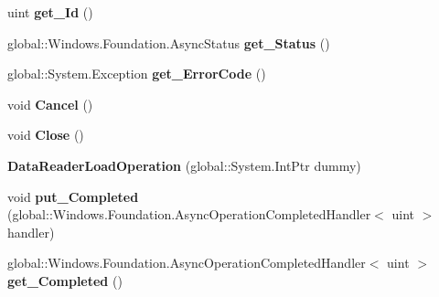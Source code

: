 \begin{DoxyCompactItemize}
uint {\bfseries get\+\_\+\+Id} ()
\item 
\mbox{\label{class_windows_1_1_storage_1_1_streams_1_1_data_reader_load_operation_a7eee8fde2644e8d129c57b70e838cd7d}} 
global\+::\+Windows.\+Foundation.\+Async\+Status {\bfseries get\+\_\+\+Status} ()
\item 
\mbox{\label{class_windows_1_1_storage_1_1_streams_1_1_data_reader_load_operation_a2c6181e3b5357ed9b288bdf9ac27171d}} 
global\+::\+System.\+Exception {\bfseries get\+\_\+\+Error\+Code} ()
\item 
\mbox{\label{class_windows_1_1_storage_1_1_streams_1_1_data_reader_load_operation_afc9128d61314f4f914e6ced27b10551a}} 
void {\bfseries Cancel} ()
\item 
\mbox{\label{class_windows_1_1_storage_1_1_streams_1_1_data_reader_load_operation_a4b0027a73595ac1ed2b96b4c17c64541}} 
void {\bfseries Close} ()
\item 
\mbox{\label{class_windows_1_1_storage_1_1_streams_1_1_data_reader_load_operation_a1bc1b17adae2e272b26f6a612e36b5a9}} 
{\bfseries Data\+Reader\+Load\+Operation} (global\+::\+System.\+Int\+Ptr dummy)
\item 
\mbox{\label{class_windows_1_1_storage_1_1_streams_1_1_data_reader_load_operation_a825056cde4984124d6ba72b348a21927}} 
void {\bfseries put\+\_\+\+Completed} (global\+::\+Windows.\+Foundation.\+Async\+Operation\+Completed\+Handler$<$ uint $>$ handler)
\item 
\mbox{\label{class_windows_1_1_storage_1_1_streams_1_1_data_reader_load_operation_ac568f7677660d25791d132dadf2fa2b8}} 
global\+::\+Windows.\+Foundation.\+Async\+Operation\+Completed\+Handler$<$ uint $>$ {\bfseries get\+\_\+\+Completed} ()
\item 
\mbox{\label{class_windows_1_1_storage_1_1_streams_1_1_data_reader_load_operation_a71f1295140022865ce49695a3490008d}} 

\end{DoxyCompactItemize}
